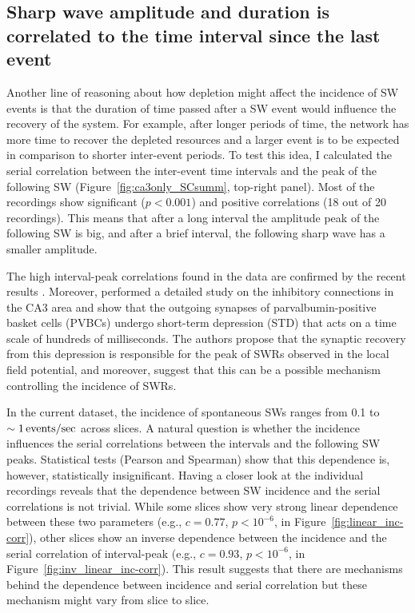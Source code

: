   \subsection{Sharp wave amplitude and duration is correlated to the time interval since the last event}
    \label{sec:swr_int-amp}
    Another line of reasoning about how depletion might affect the incidence of
    SW events is that the duration of time passed after a SW event would
    influence the recovery of the system. For example, after longer periods of
    time, the network has more time to recover the depleted resources and a
    larger event is to be expected in comparison to shorter inter-event
    periods. To test this idea, I calculated the serial correlation between the
    inter-event time intervals and the peak of the following SW
    (Figure~\ref{fig:ca3only_SCsumm}, top-right panel). Most of the recordings
    show significant ($p<0.001$) and positive correlations (18 out of 20
    recordings). This means that after a long interval the amplitude peak of
    the following SW is big, and after a brief interval, the following sharp
    wave has a smaller amplitude. 

    The high interval-peak correlations found in the data are confirmed by the
    recent results \citep{Kohus2016}. Moreover, \cite{Kohus2016} performed a
    detailed study on the inhibitory connections in the CA3 area and show that
    the outgoing synapses of parvalbumin-positive basket cells (PVBCs) undergo
    short-term depression (STD) that acts on a time scale of hundreds of
    milliseconds. The authors propose that the synaptic recovery from this
    depression is responsible for the peak of SWRs observed in the local field
    potential, and moreover, suggest that this can be a possible mechanism
    controlling the incidence of SWRs.
    
    In the current dataset, the incidence of spontaneous SWs ranges from 0.1 to
    $\sim 1 \,\rm events/sec$ across slices. A natural question is whether the
    incidence influences the serial correlations between the intervals and the
    following SW peaks. Statistical tests (Pearson and Spearman) show that this
    dependence is, however, statistically insignificant. Having a closer look
    at the individual recordings reveals that the dependence between SW
    incidence and the serial correlations is not trivial. While some slices
    show very strong linear dependence between these two parameters (e.g.,
    $c=0.77$, $p<10^{-6}$, in Figure~\ref{fig:linear_inc-corr}), other slices
    show an inverse dependence between the incidence and the serial correlation
    of interval-peak (e.g., $c=0.93$, $p<10^{-6}$, in
    Figure~\ref{fig:inv_linear_inc-corr}). This result suggests that there are
    mechanisms behind the dependence between incidence and serial correlation
    but these mechanism might vary from slice to slice.
    
